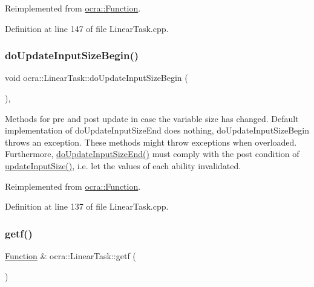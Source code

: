 Reimplemented from \hyperlink{classocra_1_1Function_a17aa280f0e6eff4a7569edc373a5147d}{ocra\+::\+Function}.



Definition at line 147 of file Linear\+Task.\+cpp.

\hypertarget{classocra_1_1LinearTask_a9db869913d96b6917b2d40211761c019}{}\label{classocra_1_1LinearTask_a9db869913d96b6917b2d40211761c019} 
\subsubsection{\texorpdfstring{do\+Update\+Input\+Size\+Begin()}{doUpdateInputSizeBegin()}}
{\footnotesize\ttfamily void ocra\+::\+Linear\+Task\+::do\+Update\+Input\+Size\+Begin (\begin{DoxyParamCaption}{ }\end{DoxyParamCaption})\hspace{0.3cm}{\ttfamily [protected]}, {\ttfamily [virtual]}}

Methods for pre and post update in case the variable size has changed. Default implementation of do\+Update\+Input\+Size\+End does nothing, do\+Update\+Input\+Size\+Begin throws an exception. These methods might throw exceptions when overloaded. Furthermore, {\ttfamily \hyperlink{classocra_1_1LinearFunction_ac6bdf62ad6634397778d5f4223ed6d82}{do\+Update\+Input\+Size\+End()}} must comply with the post condition of {\ttfamily \hyperlink{classocra_1_1Function_a3a5b9e6ae296339acc87ab2cbf97ef98}{update\+Input\+Size()}}, i.\+e. let the values of each ability invalidated. 

Reimplemented from \hyperlink{classocra_1_1Function_a3f728f3758e6448aa59932853db5ddcc}{ocra\+::\+Function}.



Definition at line 137 of file Linear\+Task.\+cpp.

\hypertarget{classocra_1_1LinearTask_a64b0390b8b65bcd5a533c0b6774615ec}{}\label{classocra_1_1LinearTask_a64b0390b8b65bcd5a533c0b6774615ec} 
\subsubsection{\texorpdfstring{getf()}{getf()}\hspace{0.1cm}{\footnotesize\ttfamily [1/2]}}
{\footnotesize\ttfamily \hyperlink{classocra_1_1Function}{Function} \& ocra\+::\+Linear\+Task\+::getf (\begin{DoxyParamCaption}{ }\end{DoxyParamCaption})\hspace{0.3cm}{\ttfamily [inline]}}



